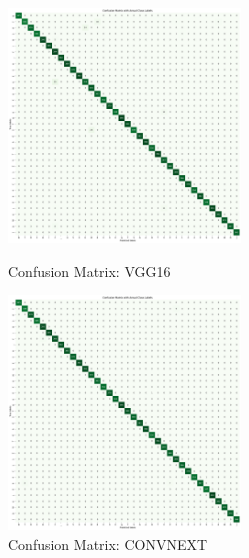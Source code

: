 \begin{figure}[h!]
    \centering
    \includegraphics[width=0.55\textwidth]{Assets/confusion_matrix/vgg16.png}
    \caption{Confusion Matrix: VGG16}
    \vspace{1.5cm}
    \includegraphics[width=0.55\textwidth]{Assets/confusion_matrix/CONVNEXT.png}
    \caption{Confusion Matrix: CONVNEXT}
\end{figure}

